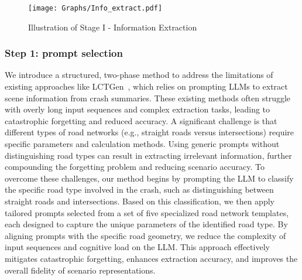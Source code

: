 \begin{figure}[!t]
\setlength{\abovecaptionskip}{-0.5pt}
\setlength{\belowcaptionskip}{-2pt} 
  \centering
  \texttt{[image: Graphs/Info\_extract.pdf]}
  \caption{Illustration of Stage I - Information Extraction}
  \label{fig:Info_ext}
\end{figure}

\subsubsection{Step 1: prompt selection}
We introduce a structured, two-phase method to address the limitations of existing approaches like LCTGen~\cite{tan2023language}, which relies on prompting LLMs to extract scene information from crash summaries. These existing methods often struggle with overly long input sequences and complex extraction tasks, leading to catastrophic forgetting and reduced accuracy. A significant challenge is that different types of road networks (e.g., straight roads versus intersections) require specific parameters and calculation methods. Using generic prompts without distinguishing road types can result in extracting irrelevant information, further compounding the forgetting problem and reducing scenario accuracy. To overcome these challenges, our method begins by prompting the LLM to classify the specific road type involved in the crash, such as distinguishing between straight roads and intersections. Based on this classification, we then apply tailored prompts selected from a set of five specialized road network templates, each designed to capture the unique parameters of the identified road type. By aligning prompts with the specific road geometry, we reduce the complexity of input sequences and cognitive load on the LLM. This approach effectively mitigates catastrophic forgetting, enhances extraction accuracy, and improves the overall fidelity of scenario representations.

